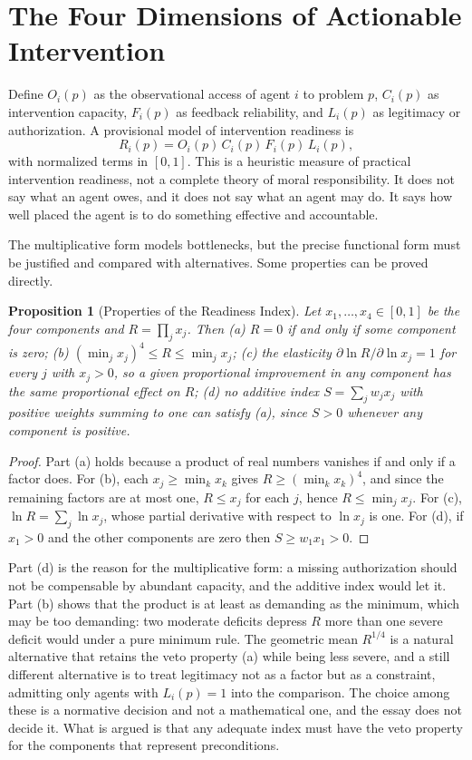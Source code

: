 \documentclass[11pt]{report}
\newtheorem{proposition}[theorem]{Proposition}
\theoremstyle{definition}
\theoremstyle{remark}
\begin{document}
\section{The Four Dimensions of Actionable Intervention}

Define $O_i(p)$ as the observational access of agent $i$ to problem $p$, $C_i(p)$ as intervention capacity, $F_i(p)$ as feedback reliability, and $L_i(p)$ as legitimacy or authorization. A provisional model of intervention readiness is
\[
R_i(p)=O_i(p)\,C_i(p)\,F_i(p)\,L_i(p),
\]
with normalized terms in $[0,1]$. This is a heuristic measure of practical intervention readiness, not a complete theory of moral responsibility. It does not say what an agent owes, and it does not say what an agent may do. It says how well placed the agent is to do something effective and accountable.

The multiplicative form models bottlenecks, but the precise functional form must be justified and compared with alternatives. Some properties can be proved directly.

\begin{proposition}[Properties of the Readiness Index]\label{prop:readiness}
Let $x_1,\dots,x_4\in[0,1]$ be the four components and $R=\prod_jx_j$. Then
(a) $R=0$ if and only if some component is zero;
(b) $(\min_jx_j)^4\le R\le\min_jx_j$;
(c) the elasticity $\partial\ln R/\partial\ln x_j=1$ for every $j$ with $x_j>0$, so a given proportional improvement in any component has the same proportional effect on $R$;
(d) no additive index $S=\sum_jw_jx_j$ with positive weights summing to one can satisfy (a), since $S>0$ whenever any component is positive.
\end{proposition}

\begin{proof}
Part (a) holds because a product of real numbers vanishes if and only if a factor does. For (b), each $x_j\ge\min_kx_k$ gives $R\ge(\min_kx_k)^4$, and since the remaining factors are at most one, $R\le x_j$ for each $j$, hence $R\le\min_jx_j$. For (c), $\ln R=\sum_j\ln x_j$, whose partial derivative with respect to $\ln x_j$ is one. For (d), if $x_1>0$ and the other components are zero then $S\ge w_1x_1>0$.
\end{proof}

Part (d) is the reason for the multiplicative form: a missing authorization should not be compensable by abundant capacity, and the additive index would let it. Part (b) shows that the product is at least as demanding as the minimum, which may be too demanding: two moderate deficits depress $R$ more than one severe deficit would under a pure minimum rule. The geometric mean $R^{1/4}$ is a natural alternative that retains the veto property (a) while being less severe, and a still different alternative is to treat legitimacy not as a factor but as a constraint, admitting only agents with $L_i(p)=1$ into the comparison. The choice among these is a normative decision and not a mathematical one, and the essay does not decide it. What is argued is that any adequate index must have the veto property for the components that represent preconditions.
\end{document}

